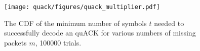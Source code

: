 \begin{figure}[t]
    \centering
    \texttt{[image: quack/figures/quack\_multiplier.pdf]}
    \caption{The CDF of the minimum number of symbols $t$ needed to successfully
    decode an quACK for various numbers of missing packets $m$, 100000 trials.}
    \label{fig:quack:iblt-correctness}
\end{figure}